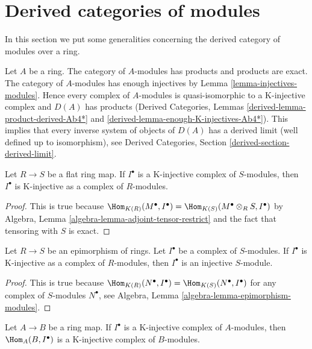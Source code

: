 \section{Derived categories of modules}
\label{section-derived-modules}

\noindent
In this section we put some generalities concerning the
derived category of modules over a ring.

\medskip\noindent
Let $A$ be a ring. The category of $A$-modules has products and products are
exact. The category of $A$-modules has enough injectives by
Lemma \ref{lemma-injectives-modules}. Hence every complex of $A$-modules
is quasi-isomorphic to a K-injective complex and $D(A)$ has products
(Derived Categories, Lemmas \ref{derived-lemma-product-derived-Ab4*} and
\ref{derived-lemma-enough-K-injectives-Ab4*}).
This implies that every inverse system of objects of $D(A)$
has a derived limit (well defined up to isomorphism), see
Derived Categories, Section \ref{derived-section-derived-limit}.

\begin{lemma}
\label{lemma-K-injective-flat}
Let $R \to S$ be a flat ring map. If $I^\bullet$ is a K-injective
complex of $S$-modules, then $I^\bullet$ is K-injective as a
complex of $R$-modules.
\end{lemma}

\begin{proof}
This is true because
$\Hom_{K(R)}(M^\bullet, I^\bullet) =
\Hom_{K(S)}(M^\bullet \otimes_R S, I^\bullet)$
by Algebra, Lemma \ref{algebra-lemma-adjoint-tensor-restrict}
and the fact that tensoring with $S$ is exact.
\end{proof}

\begin{lemma}
\label{lemma-K-injective-epimorphism}
Let $R \to S$ be an epimorphism of rings. Let $I^\bullet$ be a complex
of $S$-modules. If $I^\bullet$ is K-injective as a complex of
$R$-modules, then $I^\bullet$ is an injective $S$-module.
\end{lemma}

\begin{proof}
This is true because
$\Hom_{K(R)}(N^\bullet, I^\bullet) =
\Hom_{K(S)}(N^\bullet, I^\bullet)$ for any complex of $S$-modules
$N^\bullet$,
see Algebra, Lemma \ref{algebra-lemma-epimorphism-modules}.
\end{proof}

\begin{lemma}
\label{lemma-hom-K-injective}
Let $A \to B$ be a ring map. If $I^\bullet$ is a K-injective complex of
$A$-modules, then $\Hom_A(B, I^\bullet)$ is a K-injective complex of
$B$-modules.
\end{lemma}

